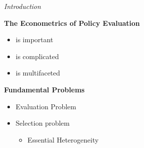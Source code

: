 \begin{frame}\begin{center}
		\LARGE\textit{Introduction}
\end{center}\end{frame}

\begin{frame}\textbf{The Econometrics of Policy Evaluation}\vspace{0.3cm}

\begin{itemize}\setlength\itemsep{1em}
\item is important
\item is complicated
\item is multifaceted
\end{itemize}

\end{frame}


\begin{frame}\textbf{Fundamental Problems}\vspace{0.3cm}

\begin{itemize}\setlength\itemsep{1em}
\item Evaluation Problem
\item Selection problem\medskip
\begin{itemize}\setlength\itemsep{1em}
\item Essential Heterogeneity
\end{itemize}
\end{itemize}

\end{frame}

